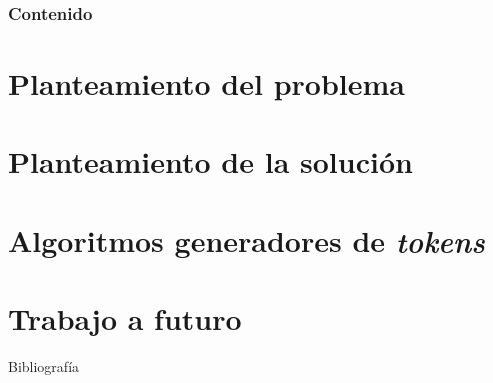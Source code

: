 \documentclass{beamer}
\begin{document}
  {
  \frame{\titlepage}}

  \begin{frame}
    \frametitle{Contenido}
    \tableofcontents[pausesections]
  \end{frame}

  \setlength{\parskip}{0.5em}


  \section{Planteamiento del problema}

  \begin{frame}{}

  \end{frame}

  \section{Planteamiento de la solución}

  \begin{frame}{}

  \end{frame}

  \section{Algoritmos generadores de \textit{tokens}}

  \begin{frame}{}

  \end{frame}

  \section{Trabajo a futuro}

  \begin{frame}{}

  \end{frame}

  \begin{frame}[allowframebreaks]{Bibliografía}
    \printbibliography
  \end{frame}
\end{document}

